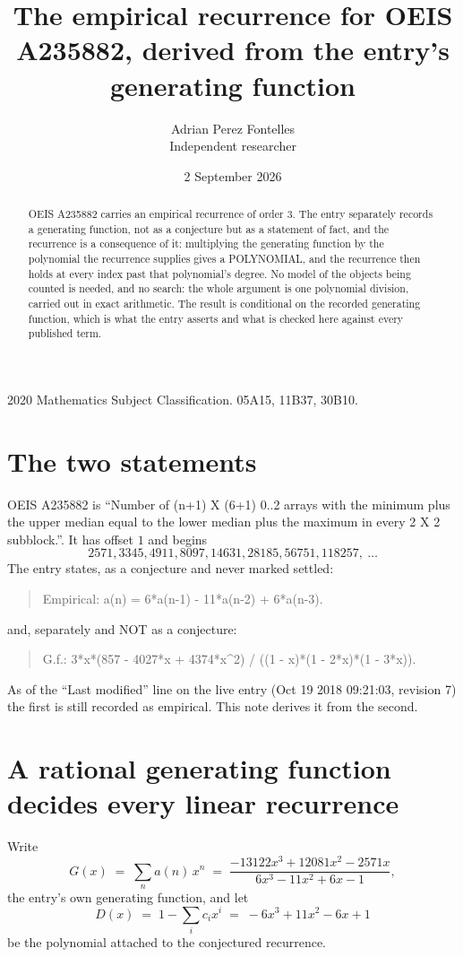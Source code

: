 \documentclass[11pt,a4paper]{article}
\title{The empirical recurrence for OEIS A235882, derived from the entry's generating function}
\author{Adrian Perez Fontelles\\ \small Independent researcher}
\date{2 September 2026}
\theoremstyle{plain}
\theoremstyle{definition}
\begin{document}
\maketitle

\begin{abstract}
OEIS A235882 carries an empirical recurrence of order $3$. The entry separately records a
generating function, not as a conjecture but as a statement of fact, and the recurrence is a
consequence of it: multiplying the generating function by the polynomial the recurrence
supplies gives a POLYNOMIAL, and the recurrence then holds at every index past that
polynomial's degree. No model of the objects being counted is needed, and no search: the
whole argument is one polynomial division, carried out in exact arithmetic. The result is
conditional on the recorded generating function, which is what the entry asserts and what is
checked here against every published term.
\end{abstract}

\noindent\small 2020 Mathematics Subject Classification. 05A15, 11B37, 30B10.\normalsize

\section{The two statements}

OEIS A235882 is ``Number of (n+1) X (6+1) 0..2 arrays with the minimum plus the upper median equal to the lower median plus the maximum in every 2 X 2 subblock.''. It has offset $1$ and begins
\[
2571, 3345, 4911, 8097, 14631, 28185, 56751, 118257,\ \dots
\]
The entry states, as a conjecture and never marked settled:
\begin{quote}
Empirical: a(n) = 6*a(n-1) - 11*a(n-2) + 6*a(n-3).
\end{quote}
and, separately and NOT as a conjecture:
\begin{quote}
G.f.: 3*x*(857 - 4027*x + 4374*x\^{}2) / ((1 - x)*(1 - 2*x)*(1 - 3*x)).
\end{quote}
As of the ``Last modified'' line on the live entry (Oct 19 2018 09:21:03, revision 7) the first is still
recorded as empirical. This note derives it from the second.

\section{A rational generating function decides every linear recurrence}

Write
\[
G(x)\;=\;\sum_{n}a(n)\,x^{n}\;=\;\frac{- 13122 x^{3} + 12081 x^{2} - 2571 x}{6 x^{3} - 11 x^{2} + 6 x - 1},
\]
the entry's own generating function, and let
\[
D(x)\;=\;1-\sum_i c_i x^{i}\;=\;- 6 x^{3} + 11 x^{2} - 6 x + 1
\]
be the polynomial attached to the conjectured recurrence.
\end{document}
